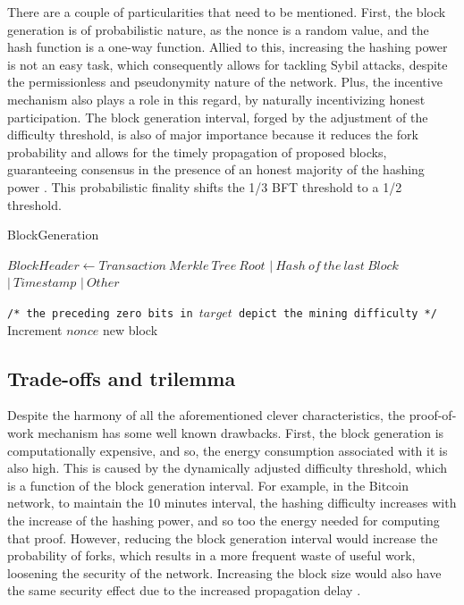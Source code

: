 \documentclass[journal]{IEEEtran}
\newcommand{\LineComment}[1]{\State \texttt{/* #1 */}}
\begin{document}
There are a couple of particularities that need to be mentioned. First, the block generation
is of probabilistic nature, as the nonce is a random value, and the hash function is a one-way function.
Allied to this, increasing the hashing power is not an easy task, which consequently allows for tackling Sybil attacks,
despite the permissionless and pseudonymity nature of the network. Plus, the incentive mechanism
also plays a role in this regard, by naturally incentivizing honest participation.
The block generation interval, forged by the adjustment of the difficulty
threshold, is also of major importance because it reduces the fork probability and
allows for the timely propagation of proposed blocks, guaranteeing consensus
in the presence of an honest majority of the hashing power \cite{garay2015bitcoin, natoli2019deconstructing}.
This probabilistic finality shifts the 1/3 BFT threshold to a 1/2 threshold.

\begin{algorithm}
  \caption[short]{BlockGeneration}\label{alg:BlockGeneration}
  \begin{algorithmic}[1]
    \Function {}{}
      \State $Block Header \gets Transaction \ Merkle \ Tree \ Root$
      \Indent
        \State $| \ Hash \ of \ the \ last \ Block$
        \State $| \ Timestamp$
        \State $| \ Other$
      \EndIndent
      
      \LineComment{the preceding zero bits in $target$ depict the mining difficulty}
      \State Increment $nonce$
      \EndWhile
      \State \Return new block
    \EndFunction
  \end{algorithmic}
\end{algorithm}

\subsection{Trade-offs and trilemma}

Despite the harmony of all the aforementioned clever characteristics,
the proof-of-work mechanism has some well known drawbacks. 
First, the block generation is computationally expensive, and so, the
energy consumption associated with it is also high. This is caused by the
dynamically adjusted difficulty threshold, which is a function of the block 
generation interval. For example, in the Bitcoin network, to maintain the 10 
minutes interval, the hashing difficulty
increases with the increase of the hashing power, and so too the energy needed for computing that proof. 
However, reducing the block generation interval would increase the
probability of forks, which results in a more frequent waste of useful work,
loosening the security of the network. Increasing the block size would also
have the same security effect due to the increased propagation delay \cite{8629877, natoli2019deconstructing}.
\end{document}
